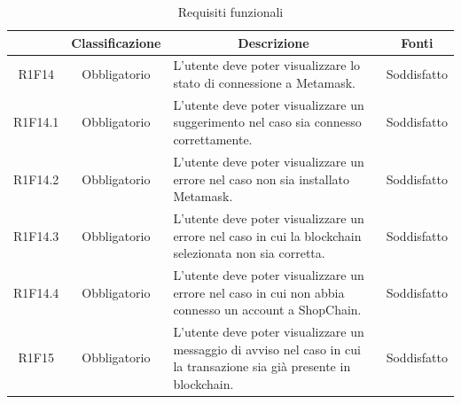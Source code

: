 \begin{table}[H]
    \centering
    \renewcommand{\arraystretch}{1.8}
    \begin{tabular}{c | c | p{6cm} | c}
        \rowcolor[HTML]{125E28}
        \multicolumn{1}{c}{\color[HTML]{FFFFFF} \textbf{Codice}}          &
        \multicolumn{1}{c}{\color[HTML]{FFFFFF} \textbf{Classificazione}} &
        \multicolumn{1}{c}{\color[HTML]{FFFFFF} \textbf{Descrizione}}     &
        \multicolumn{1}{c}{\color[HTML]{FFFFFF} \textbf{Fonti}}                                                                                                                                                                   \\
        \hline
        R1F14                                                             & Obbligatorio & L'utente deve poter visualizzare lo stato di connessione a Metamask\glo{}.                                       &Soddisfatto                      \\
        R1F14.1                                                           & Obbligatorio & L'utente deve poter visualizzare un suggerimento nel caso sia connesso correttamente.                      & Soddisfatto                     \\
        R1F14.2                                                           & Obbligatorio & L'utente deve poter visualizzare un errore nel caso non sia installato Metamask\glo{}.                                             & Soddisfatto   \\
        R1F14.3                                                           & Obbligatorio & L'utente deve poter visualizzare un errore nel caso in cui la blockchain selezionata non sia corretta.                       & Soddisfatto   \\
        R1F14.4                                                           & Obbligatorio & L'utente deve poter visualizzare un errore nel caso in cui non abbia connesso un account a ShopChain.                        & Soddisfatto   \\
        R1F15                                                             & Obbligatorio & L'utente deve poter visualizzare un messaggio di avviso nel caso in cui la transazione sia già presente in blockchain\glo{}. & Soddisfatto \\
    \end{tabular}
    \caption{Requisiti funzionali}
\end{table}


